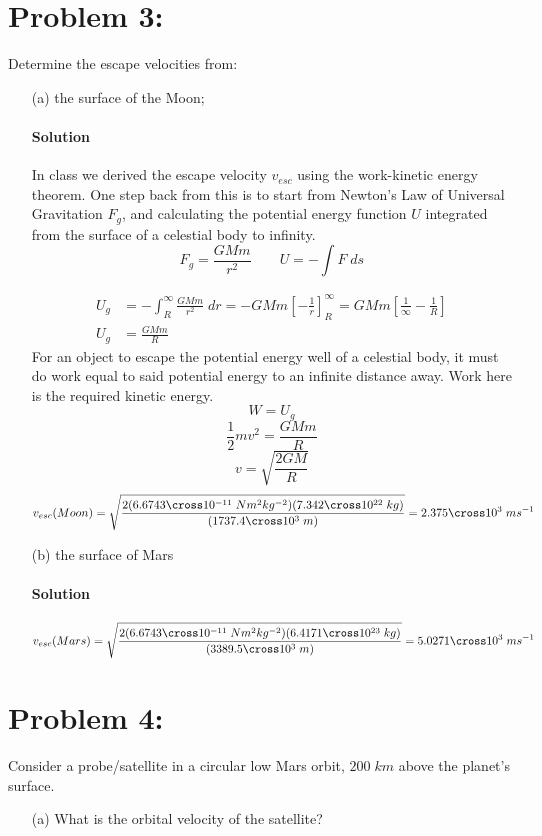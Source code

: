 \documentclass{article}
\begin{document}
{\begin{enumerate}
	\end{enumerate}
	\clearpage
	\section*{Problem 3: }
	\boldmath
	Determine the escape velocities from:  \\
	\begin{enumerate}
		\item[(a)] the surface of the Moon;
		\paragraph{Solution} In class we derived the escape velocity $v_{esc}$ using the work-kinetic energy theorem. One step back from this is to start from Newton's Law of Universal Gravitation $F_g$, and calculating the potential energy function $U$ integrated from the surface of a celestial body to infinity.  \unboldmath 
		\[
			F_g = \frac{GMm}{r^2} \quad \quad U= - \int F \; ds
		\]
		
		\begin{equation*}
			\begin{split}
				U_g &= - \int_{R}^{\infty} \frac{GMm}{r^2} \; dr = -GMm \left[ -\frac{1}{r} \right]_{R}^{\infty} = GMm \left[ \frac{1}{\infty} - \frac{1}{R} \right] \\
				U_g &= \frac{GMm}{R}
			\end{split}
		\end{equation*}
		For an object to escape the potential energy well of a celestial body, it must do work equal to said potential energy to an infinite distance away. Work here is the required kinetic energy.
		\[
			W = U_g
		\]
		\[
			\frac{1}{2}m v^2 = \frac{GMm}{R}
		\]
		\[
			v = \sqrt{\frac{2GM}{R}}
		\]
		\[
			v_{esc}(Moon) = \sqrt{\frac{2(6.6743 \cross 10^{-11} \; Nm^2kg^{-2})(7.342 \cross 10^{22} \; kg)}{(1737.4 \cross 10^3 \; m)}} = 2.375 \cross 10^3 \; m s^{-1}
		\]
		\boldmath
		\item[(b)] the surface of Mars
		\paragraph{Solution} \unboldmath
		\[
			v_{esc}(Mars) = \sqrt{\frac{2(6.6743 \cross 10^{-11} \; Nm^2kg^{-2})(6.4171 \cross 10^{23} \; kg)}{(3389.5 \cross 10^3 \; m)}} = 5.0271 \cross 10^3 \; m s^{-1}
		\]
		
	\end{enumerate}
	
	\section*{Problem 4: }
	\boldmath
	Consider a probe/satellite in a circular low Mars orbit, $200 \; km$ above the planet’s surface. \\
	\begin{enumerate}
		\item[(a)] What is the orbital velocity of the satellite?

\end{enumerate}}
\end{document}
